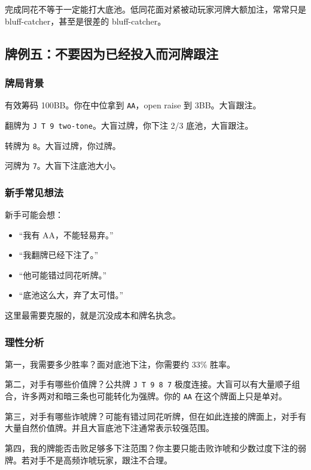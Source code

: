 完成同花不等于一定能打大底池。低同花面对紧被动玩家河牌大额加注，常常只是 bluff-catcher，甚至是很差的 bluff-catcher。

\subsection{牌例五：不要因为已经投入而河牌跟注}

\subsubsection*{牌局背景}

有效筹码 100BB。你在中位拿到 \texttt{AA}，open raise 到 3BB。大盲跟注。

翻牌为 \texttt{J T 9 two-tone}。大盲过牌，你下注 2/3 底池，大盲跟注。

转牌为 \texttt{8}。大盲过牌，你过牌。

河牌为 \texttt{7}。大盲下注底池大小。

\subsubsection*{新手常见想法}

新手可能会想：

\begin{itemize}
\item “我有 AA，不能轻易弃。”
\item “我翻牌已经下注了。”
\item “他可能错过同花听牌。”
\item “底池这么大，弃了太可惜。”
\end{itemize}

这里最需要克服的，就是沉没成本和牌名执念。

\subsubsection*{理性分析}

第一，我需要多少胜率？面对底池下注，你需要约 33\% 胜率。

第二，对手有哪些价值牌？公共牌 \texttt{J T 9 8 7} 极度连接。大盲可以有大量顺子组合，许多两对和暗三条也可能转化为强牌。你的 \texttt{AA} 在这个牌面上只是单对。

第三，对手有哪些诈唬牌？可能有错过同花听牌，但在如此连接的牌面上，对手有大量自然价值牌。并且大盲底池下注通常表示较强范围。

第四，我的牌能否击败足够多下注范围？你主要只能击败诈唬和少数过度下注的弱牌。若对手不是高频诈唬玩家，跟注不合理。

